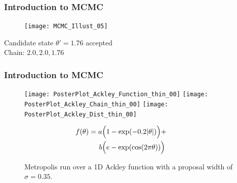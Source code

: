 \documentclass{beamer}
\begin{document}
\begin{frame}
	\frametitle{Introduction to MCMC}
	
	\begin{figure}[!htb]
		\centering
		\texttt{[image: MCMC\_Illust\_05]}
	\end{figure}
	Candidate state $\theta' = 1.76$ accepted \\ %
	Chain: $2.0, 2.0, 1.76$
\end{frame}

\begin{frame}	
	\frametitle{Introduction to MCMC}
	
	\begin{figure}[!htb]
		\centering

			\texttt{[image: PosterPlot\_Ackley\_Function\_thin\_00]}
		\endminipage\hfill %
			\texttt{[image: PosterPlot\_Ackley\_Chain\_thin\_00]}
		\endminipage\hfill
			\texttt{[image: PosterPlot\_Ackley\_Dist\_thin\_00]}
		\endminipage\hfill
			\caption{Metropolis run over a 1D Ackley function with a proposal width of $\sigma = 0.35$.}
			\vspace{-10pt}
			\begin{equation}
				\begin{split}
					\hspace{ -30pt} f(\theta) = & \hspace{3pt} a \Big( 1 - \textrm{exp}(- 0.2 |\theta|) \Big) + \\
									& \hspace{4pt} b \Big( e - \textrm{exp}(\textrm{cos}(2 \pi \theta)) \Big)
				\end{split}
			\end{equation}
		\endminipage\hfill
	\end{figure}
	
	
\end{frame}
\end{document}

